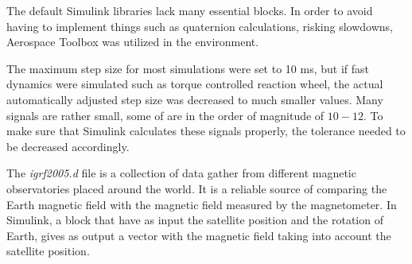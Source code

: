The default Simulink libraries lack many essential blocks. In order to avoid having to implement things such as quaternion calculations, risking slowdowns, Aerospace Toolbox was utilized in the environment.

The maximum step size for most simulations were set to 10 ms, but if fast dynamics were simulated such as torque controlled reaction wheel, the actual automatically adjusted step size was decreased to much smaller values. Many signals are rather small, some of are in the order of magnitude of $10-{12}$. To make sure that Simulink calculates these signals properly, the tolerance needed to be decreased accordingly.


The\textit{ igrf2005.d} file is a collection of data gather from different magnetic observatories placed around the world. It is a reliable source of comparing the Earth magnetic field with the magnetic field measured by the magnetometer.
In Simulink, a block that have as input the satellite position and the rotation of Earth, gives as output a vector with the magnetic field taking into account the satellite position.
